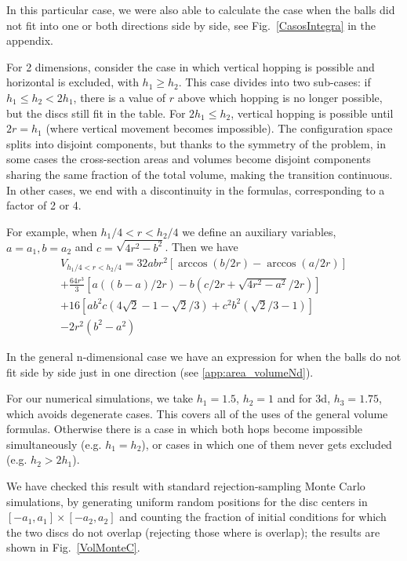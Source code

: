 \documentclass[superscriptaddress,pre,reprint,showpacs,twocolumn]{revtex4-1}
\begin{document}
In this particular case, we were also able to calculate the case when the balls
did not fit into one or both directions side by side,
see Fig.~\ref{CasosIntegra} in the appendix. 

For 2 dimensions, 
consider the case  in which vertical hopping is possible
and horizontal is excluded, with  $h_1 \geq h_2$.
This case divides into two sub-cases: if
$ h_1 \leq  h_2 < 2 h_1 $,
there is a value of $r$ above which hopping is no longer possible,
but the discs still fit in the table. For $2 h_1 \leq h_2 $, vertical hopping is
possible until $ 2 r= h_1$ (where vertical movement becomes impossible). 
The configuration space splits into disjoint components, but 
thanks to the symmetry of
the problem, in some cases the cross-section areas and 
volumes become disjoint components sharing the same fraction of
the total volume, making the transition continuous. In other cases, we end with 
a discontinuity in the formulas,
corresponding to a factor of 2 or 4. 


For example, when $h_1/4 < r < h_2/4$ 
we define an auxiliary variables, $a=a_1, b=a_2$
and
$c = \sqrt{4r^2-b^2}$. Then we have
\begin{multline}\label{VolumenCasoFeo}
V_{h_1/4<r<h_2/4} = 32abr^2 \left[ \arccos(b/2r)-\arccos(a/2r) \right]\\
+\frac{64 r^3}{3 } \left[ a((b-a)/2r)-b(c/2r+\sqrt{4r^2-a^2}/2r) \right]\\
+16 \left[ a b^2 c (4\sqrt{2}-1-\sqrt{2}/3) 
  +c^2b^2 (\sqrt{2}/3-1) \right]\\
-2r^2 (b^2-a^2)
\end{multline}

In the general n-dimensional case we have an expression for when the balls
do not fit side by side just in one direction (see \ref{app:area_volumeNd}).

For our numerical simulations, we take $h_1=1.5$, $h_2=1$ and for 3d, $h_3=1.75$,
which avoids degenerate cases. 
This covers all of the uses of the general volume formulas.
Otherwise there is a case in which both hops become impossible simultaneously
(e.g. $h_1=h_2$), or cases in which one of them never gets excluded (e.g. $h_2>2h_1$).


We have checked this result with standard rejection-sampling Monte Carlo simulations, 
by generating uniform random positions for the disc centers in 
$[-a_1,a_1] \times [-a_2,a_2]$ and 
counting the fraction of initial conditions for 
which the two discs do not overlap (rejecting those where is overlap); the results are shown in Fig.~\ref{VolMonteC}.
\end{document}
